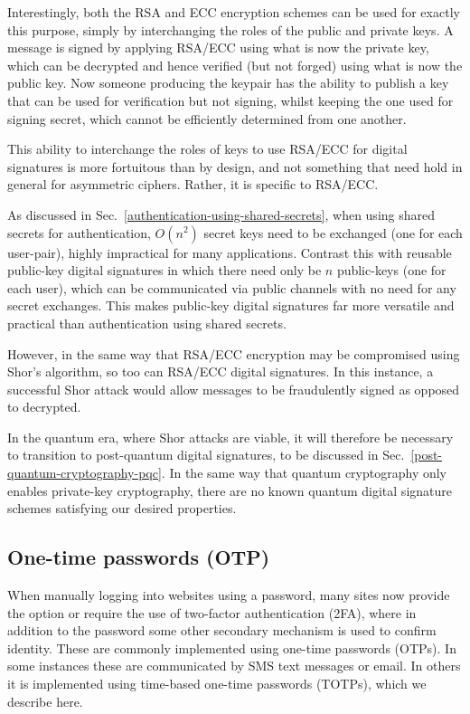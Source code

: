 Interestingly, both the RSA and ECC encryption schemes can be used for exactly this purpose, simply by interchanging the roles of the public and private keys. A message is signed by applying RSA/ECC using what is now the private key, which can be decrypted and hence verified (but not forged) using what is now the public key. Now someone producing the keypair has the ability to publish a key that can be used for verification but not signing, whilst keeping the one used for signing secret, which cannot be efficiently determined from one another.

This ability to interchange the roles of keys to use RSA/ECC for digital signatures is more fortuitous than by design, and not something that need hold in general for asymmetric ciphers. Rather, it is specific to RSA/ECC.

As discussed in Sec.~\ref{authentication-using-shared-secrets}, when using shared secrets for authentication, $O(n^2)$ secret keys need to be exchanged (one for each user-pair), highly impractical for many applications. Contrast this with reusable public-key digital signatures in which there need only be $n$ public-keys (one for each user), which can be communicated via public channels with no need for any secret exchanges. This makes public-key digital signatures far more versatile and practical than authentication using shared secrets.

However, in the same way that RSA/ECC encryption may be compromised using Shor's algorithm, so too can RSA/ECC digital signatures. In this instance, a successful Shor attack would allow messages to be fraudulently signed as opposed to decrypted.

In the quantum era, where Shor attacks are viable, it will therefore be necessary to transition to post-quantum digital signatures, to be discussed in Sec.~\ref{post-quantum-cryptography-pqc}. In the same way that quantum cryptography only enables private-key cryptography, there are no known quantum digital signature schemes satisfying our desired properties.

\subsection{One-time passwords (OTP)}

When manually logging into websites using a password, many sites now provide the option or require the use of two-factor authentication (2FA), where in addition to the password some other secondary mechanism is used to confirm identity. These are commonly implemented using one-time passwords (OTPs). In some instances these are communicated by SMS text messages or email. In others it is implemented using time-based one-time passwords (TOTPs), which we describe here.

